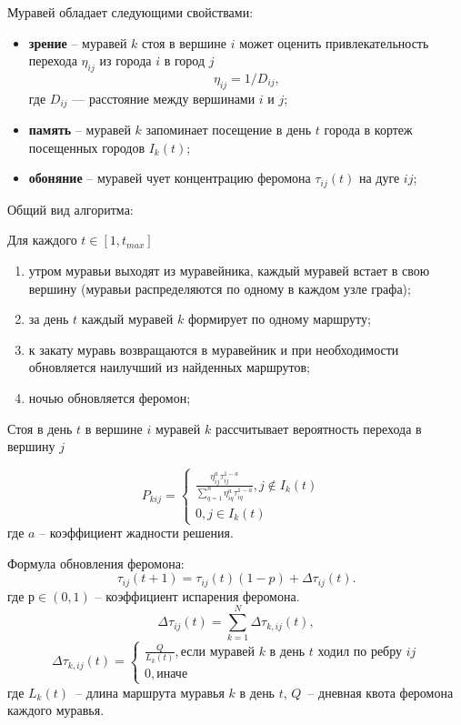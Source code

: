 Муравей обладает следующими свойствами:
\begin{itemize}
	\item \textbf{зрение} -- муравей $k$ стоя в вершине $i$ может оценить привлекательность перехода $\eta_{ij}$ из города $i$ в город $j$
	\begin{equation}
		\eta_{ij} = 1 / D_{ij},
	\end{equation}
	где $D_{ij}$ — расстояние между вершинами $i$ и $j$;
	
	
	\item \textbf{память} -- муравей $k$ запоминает посещение в день $t$ города в кортеж посещенных городов $I_{k}(t)$;
	
	\item \textbf{обоняние} -- муравей чует концентрацию феромона $\tau_{ij}(t)$ на дуге $ij$;
	
\end{itemize}

Общий вид алгоритма: 

Для каждого $t \in [1, t_{max}]$
\begin{enumerate}[label={\arabic*)}]
	\item утром муравьи выходят из муравейника, каждый муравей встает в свою вершину (муравьи распределяются по одному в каждом узле графа);
	\item за день $t$ каждый муравей $k$ формирует по одному маршруту;
	\item к закату муравь возвращаются в муравейник и при необходимости обновляется наилучший из найденных маршрутов;
	\item ночью обновляется феромон;
\end{enumerate}

Стоя в день $t$ в вершине $i$ муравей $k$ рассчитывает вероятность перехода в вершину $j$

\begin{equation}
	P_{kij} = \begin{cases}
		\frac{\eta_{ij}^a\tau_{ij}^{1-a}}{\sum_{q=1}^n \eta^a_{iq}\tau^{1-a}_{iq}}, \textrm{$j \notin I_{k}(t)$ } \\
		0, \textrm{$j \in I_{k}(t)$ }
	\end{cases}
\end{equation}
где $a$ -- коэффициент жадности решения.

Формула обновления феромона:
\begin{equation}
	\tau_{ij}(t+1) = \tau_{ij}(t)(1-p) + \Delta \tau_{ij}(t).
\end{equation}
где $р \in (0, 1)$ -- коэффициент испарения феромона.
\begin{equation}
	\Delta \tau_{ij}(t) = \sum_{k=1}^N \Delta \tau_{k,ij}(t),
\end{equation}
\begin{equation}
	\Delta \tau_{k,ij}(t) = \begin{cases}
		\frac{Q}{L_{k}(t)}, \textrm{если муравей $k$ в день $t$ ходил по ребру $ij$} \\
		0, \textrm{иначе}
	\end{cases}
\end{equation}
где $L_{k}(t)$~-- длина маршрута муравья $k$ в день $t$, $Q$~-- дневная квота феромона каждого муравья.

